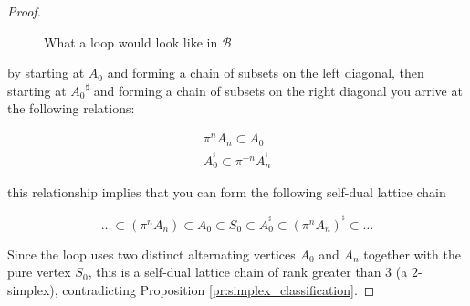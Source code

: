 \documentclass{eptcs}
\theoremstyle{remark}
\theoremstyle{definition}
\newcommand{\dual}[1]{{#1}^{\sharp}}
\begin{document}
\begin{proof}
\begin{figure}
\begin{center}
\caption{What a loop would look like in $\mathcal{B}$}
\label{fig:loop}
\end{center}
\end{figure}


    by starting at $A_0$ and forming a chain of subsets on the left diagonal, then starting at $\dual{A_0}$ and forming a chain of subsets on the right diagonal you arrive at the following relations:

    \begin{align}
    \pi^{n}A_n \subset A_0 \\
        A_0^{\dual{}} \subset \pi^{-n}A_n^{\dual{}}
    \end{align}

    this relationship implies that you can form the following self-dual lattice chain

    \begin{equation}
        \dots \subset (\pi^n A_n) \subset A_0 \subset S_0 \subset A_0^{\dual{}} \subset (\pi^n A_n)^{\dual{}} \subset \dots
    \end{equation}

    Since the loop uses two distinct alternating vertices $A_0$ and $A_n$ together with the pure vertex $S_0$, this is a self-dual lattice chain of rank greater than $3$ (a $2$-simplex), contradicting Proposition \ref{pr:simplex_classification}.
\end{proof}
\end{document}
